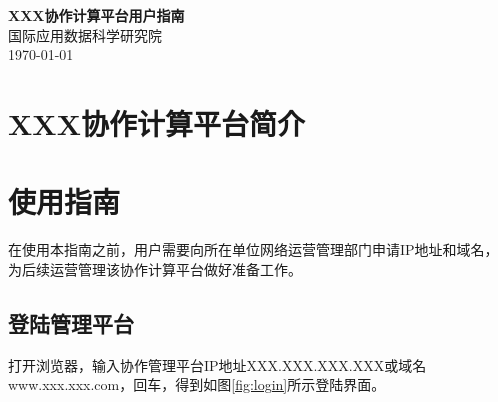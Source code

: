 \documentclass[12pt]{article}
\begin{document}
\begin{center}
  \Large \textbf{XXX协作计算平台用户指南} \\
  \vspace{0.1in}
  \normalsize 国际应用数据科学研究院 \\
  \today
\end{center}

\tableofcontents
\newpage

\section {XXX协作计算平台简介}


\section {使用指南}
在使用本指南之前，用户需要向所在单位网络运营管理部门申请IP地址和域名，为后续运营管理该协作计算平台做好准备工作。
\subsection{登陆管理平台}
打开浏览器，输入协作管理平台IP地址XXX.XXX.XXX.XXX或域名www.xxx.xxx.com，回车，得到如图\ref{fig:login}所示登陆界面。
\end{document}
